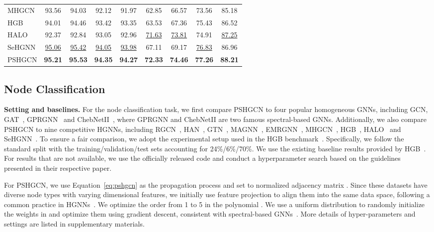\documentclass{article}
\begin{document}
\begin{table}[t]
{\begin{tabular}{@{}lcccccccc@{}}
MHGCN &93.56 &94.03 & 92.12 & 91.97 & 62.85 & 66.57 &73.56 &85.18\\

HGB   &94.01 &94.46 & 93.42 & 93.35 & 63.53 & 67.36 &75.43 &86.52 
\\

HALO   &92.37 &92.84 & 93.05 & 92.96 & \underline{71.63} & \underline{73.81} &74.91
&\underline{87.25} 
\\
SeHGNN &\underline{95.06} &\underline{95.42} & \underline{94.05} & \underline{93.98} & 67.11 & 69.17
&\underline{76.83}
&86.96
\\
PSHGCN &\textbf{95.21} &\textbf{95.53} & \textbf{94.35} & \textbf{94.27} & \textbf{72.33} & \textbf{74.46} &\textbf{77.26}
&\textbf{88.21} \\

\bottomrule
\end{tabular}}
\vspace{-6mm}
\label{tb:no_class_res}
\end{table}




\subsection{Node Classification}\label{se:node}
\textbf{Setting and baselines.} For the node classification task, we first compare PSHGCN to 
four popular homogeneous GNNs, including GCN\cite{gcn}, GAT~\cite{gat}, GPRGNN~\cite{gprgnn} and ChebNetII~\cite{chebnetii}, where GPRGNN and ChebNetII are two famous spectral-based GNNs. Additionally, we also compare PSHGCN to nine competitive HGNNs, including RGCN~\cite{rgcn}, HAN~\cite{han}, GTN~\cite{gtn}, MAGNN~\cite{magnn}, EMRGNN~\cite{emrgnn}, MHGCN~\cite{mhgcn}, HGB~\cite{hgb}, HALO~\cite{halo} and SeHGNN~\cite{sehgnn}. To ensure a fair comparison, we adopt the experimental setup used in the HGB benchmark~\cite{hgb}. Specifically, we follow the standard split with the training/validation/test sets accounting for 24\%/6\%/70\%. We use the existing baseline results provided by HGB~\cite{hgb}. For results that are not available, we use the officially released code and conduct a hyperparameter search based on the guidelines presented in their respective paper.


For PSHGCN, we use Equation~\eqref{eq:pshgcn} as the propagation process and set  to normalized adjacency matrix . Since these datasets have diverse node types with varying dimensional features, we initially use feature projection to align them into the same data space, following a common practice in HGNNs~\cite{sehgnn,hgb,emrgnn}. We optimize the order  from 1 to 5 in the polynomial . We use a uniform distribution to randomly initialize the weights  in  and optimize them using gradient descent, consistent with spectral-based GNNs~\cite{gprgnn,bernnet,chebnetii}. More details of hyper-parameters and settings are listed in supplementary materials. 
\end{document}
